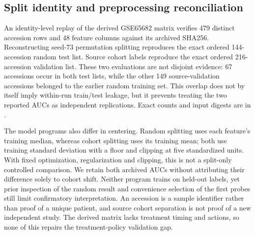 \subsection{Split identity and preprocessing reconciliation}
An identity-level replay of the derived GSE65682 matrix verifies 479 distinct accession rows and 48 feature columns against its archived SHA256. Reconstructing seed-73 permutation splitting reproduces the exact ordered 144-accession random test list. Source cohort labels reproduce the exact ordered 216-accession validation list. These two evaluations are not disjoint evidence: 67 accessions occur in both test lists, while the other 149 source-validation accessions belonged to the earlier random training set. This overlap does not by itself imply within-run train/test leakage, but it prevents treating the two reported AUCs as independent replications. Exact counts and input digests are in .

The model programs also differ in centering. Random splitting uses each feature's training median, whereas cohort splitting uses its training mean; both use training standard deviation with a floor and clipping at five standardized units. With fixed optimization, regularization and clipping, this is not a split-only controlled comparison. We retain both archived AUCs without attributing their difference solely to cohort shift. Neither program trains on held-out labels, yet prior inspection of the random result and convenience selection of the first probes still limit confirmatory interpretation. An accession is a sample identifier rather than proof of a unique patient, and source cohort separation is not proof of a new independent study. The derived matrix lacks treatment timing and actions, so none of this repairs the treatment-policy validation gap.

